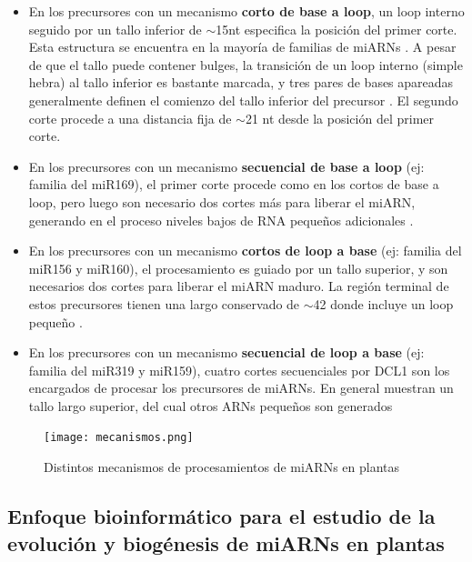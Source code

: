 \begin{itemize}
    \item En los precursores con un mecanismo \textbf{corto de base a loop}, un loop interno seguido por un tallo inferior de $\sim$15nt especifica la posición del primer corte.
        Esta estructura se encuentra en la mayoría de familias de miARNs \citep{Mateos2010,pmid20015653,pmid20015654}.
        A pesar de que el tallo puede contener bulges, la transición de un loop interno (simple hebra) al tallo inferior es bastante marcada, y tres pares de bases apareadas generalmente definen el comienzo del tallo inferior del precursor \citep{Bologna2013}.
        El segundo corte procede a una distancia fija de $\sim$21 nt desde la posición del primer corte.
    \item En los precursores con un mecanismo \textbf{secuencial de base a loop} (ej: familia del miR169), el primer corte procede como en los cortos de base a loop, pero luego son necesario dos cortes más para liberar el miARN, generando en el proceso niveles bajos de RNA pequeños adicionales \citep{Bologna2013}.
    \item En los precursores con un mecanismo \textbf{cortos de loop a base} (ej: familia del miR156 y miR160), el procesamiento es guiado por un tallo superior, y son necesarios dos cortes para liberar el miARN maduro.
        La región terminal de estos precursores tienen una largo conservado de $\sim$42 donde incluye un loop pequeño \citep{Bologna2013}.
    \item En los precursores con un mecanismo \textbf{secuencial de loop a base} (ej: familia del miR319 y miR159), cuatro cortes secuenciales por DCL1 son los encargados de procesar los precursores de miARNs.
        En general muestran un tallo largo superior, del cual otros ARNs pequeños son generados \citep{pmid19850910,Bologna2009,Bologna2013}
\end{itemize}

\begin{figure}[htbp!] 
    \centering    
    \texttt{[image: mecanismos.png]}
    \caption[Mecanismos de procesamiento]{Distintos mecanismos de procesamientos de miARNs en plantas}
    \label{fig:mecanismos}
\end{figure}

\subsection{Enfoque bioinformático para el estudio de la evolución y biogénesis de miARNs en plantas}

